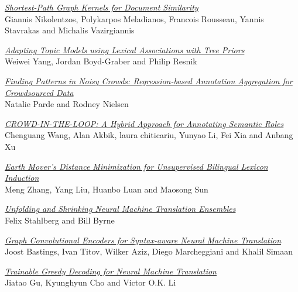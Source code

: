 \hyperlink{page.1890}{\em Shortest-Path Graph Kernels for Document Similarity}\samepage \\
\hspace*{7mm} Giannis Nikolentzos, Polykarpos Meladianos, Francois Rousseau, Yannis Stavrakas and Michalis Vazirgiannis\dotfill {}

\hyperlink{page.1901}{\em Adapting Topic Models using Lexical Associations with Tree Priors}\samepage \\
\hspace*{7mm} Weiwei Yang, Jordan Boyd-Graber and Philip Resnik\dotfill {}

\hyperlink{page.1907}{\em Finding Patterns in Noisy Crowds: Regression-based Annotation Aggregation for Crowdsourced Data}\samepage \\
\hspace*{7mm} Natalie Parde and Rodney Nielsen\dotfill {}

\hyperlink{page.1913}{\em CROWD-IN-THE-LOOP: A Hybrid Approach for Annotating Semantic Roles}\samepage \\
\hspace*{7mm} Chenguang Wang, Alan Akbik, laura chiticariu, Yunyao Li, Fei Xia and Anbang Xu\dotfill {}

\hyperlink{page.1923}{\em Earth Mover's Distance Minimization for Unsupervised Bilingual Lexicon Induction}\samepage \\
\hspace*{7mm} Meng Zhang, Yang Liu, Huanbo Luan and Maosong Sun\dotfill {}

\hyperlink{page.1935}{\em Unfolding and Shrinking Neural Machine Translation Ensembles}\samepage \\
\hspace*{7mm} Felix Stahlberg and Bill Byrne\dotfill {}

\hyperlink{page.1946}{\em Graph Convolutional Encoders for Syntax-aware Neural Machine Translation}\samepage \\
\hspace*{7mm} Joost Bastings, Ivan Titov, Wilker Aziz, Diego Marcheggiani and Khalil Simaan\dotfill {}

\hyperlink{page.1957}{\em Trainable Greedy Decoding for Neural Machine Translation}\samepage \\
\hspace*{7mm} Jiatao Gu, Kyunghyun Cho and Victor O.K. Li\dotfill {}

